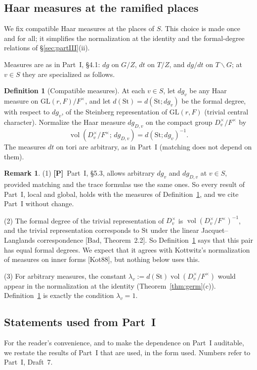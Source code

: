 \documentclass[12pt]{article}
\newcommand{\vol}{\operatorname{vol}}
\newcommand{\GL}{\mathrm{GL}}
\newcommand{\St}{\mathrm{St}}
\newcommand{\Pv}{\textbf{[P]}}
\theoremstyle{plain}
\theoremstyle{definition}
\newtheorem{definition}[theorem]{Definition}
\newtheorem{remark}[theorem]{Remark}
\begin{document}
\subsection{Haar measures at the ramified places}\label{subsec:measures}
We fix compatible Haar measures at the places of $S$. This choice is made once and for all; it simplifies the normalization at the identity and the formal-degree relations of \S\ref{sec:partIII}(ii).

Measures are as in Part~I, \S4.1: $dg$ on $G/Z$, $dt$ on $T/Z$, and $dg/dt$ on $T\backslash G$; at $v\in S$ they are specialized as follows.

\begin{definition}[Compatible measures]\label{def:measures}
At each $v\in S$, let $dg_v$ be any Haar measure on $\GL(r,F)/F^\times$, and let $d(\St)=d(\St;dg_v)$ be the formal degree, with respect to $dg_v$, of the Steinberg representation of $\GL(r,F)$ (trivial central character). Normalize the Haar measure $dg_{D,v}$ on the compact group $D_v^\times/F^\times$ by
\[ \vol(D_v^\times/F^\times;\,dg_{D,v})=d(\St;dg_v)^{-1}. \]
The measures $dt$ on tori are arbitrary, as in Part~I (matching does not depend on them).
\end{definition}

\begin{remark}\label{rem:measures}
(1) \Pv\ Part~I, \S5.3, allows arbitrary $dg_v$ and $dg_{D,v}$ at $v\in S$, provided matching and the trace formulas use the same ones. So every result of Part~I, local and global, holds with the measures of Definition~\ref{def:measures}, and we cite Part~I without change.

(2) The formal degree of the trivial representation of $D_v^\times$ is $\vol(D_v^\times/F^\times)^{-1}$, and the trivial representation corresponds to $\St$ under the linear Jacquet--Langlands correspondence [Bad, Theorem~2.2]. So Definition~\ref{def:measures} says that this pair has equal formal degrees. We expect that it agrees with Kottwitz's normalization of measures on inner forms [Kot88], but nothing below uses this.

(3) For arbitrary measures, the constant $\lambda_v:=d(\St)\vol(D_v^\times/F^\times)$ would appear in the normalization at the identity (Theorem~\ref{thm:germ}(c)). Definition~\ref{def:measures} is exactly the condition $\lambda_v=1$.
\end{remark}

\subsection{Statements used from Part~I}\label{subsec:fromPartI}
For the reader's convenience, and to make the dependence on Part~I auditable, we restate the results of Part~I that are used, in the form used. Numbers refer to Part~I, Draft~7.
\end{document}
